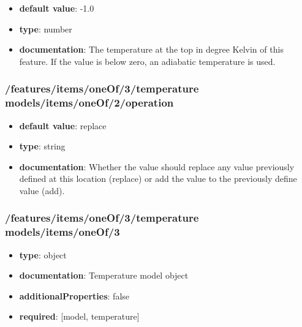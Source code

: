\begin{itemize}\item {\bf default value}: -1.0
\item {\bf type}: number
\item {\bf documentation}: The temperature at the top in degree Kelvin of this feature. If the value is below zero, an adiabatic temperature is used.
\end{itemize}\subsubsection{/features/items/oneOf/3/temperature models/items/oneOf/2/operation}
\begin{itemize}\item {\bf default value}: replace
\item {\bf type}: string
\item {\bf documentation}: Whether the value should replace any value previously defined at this location (replace) or add the value to the previously define value (add).
\end{itemize}\subsubsection{/features/items/oneOf/3/temperature models/items/oneOf/3}
\begin{itemize}\item {\bf type}: object
\item {\bf documentation}: Temperature model object
\item {\bf additionalProperties}: false
\item {\bf required}: [model, temperature]\end{itemize}
